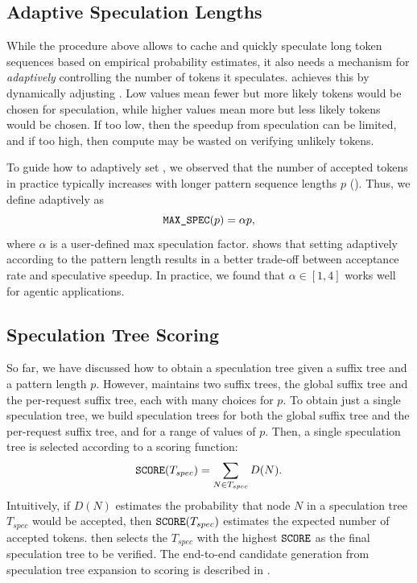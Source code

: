 \subsection{Adaptive Speculation Lengths}
\label{suffixdecoding:sec:adaptive}

While the procedure above allows \SuffixDecoding to cache and quickly speculate long token sequences based on empirical probability estimates, it also needs a mechanism for \emph{adaptively} controlling the number of tokens it speculates. \SuffixDecoding achieves this by dynamically adjusting \sdMaxSpec. Low values mean fewer but more likely tokens would be chosen for speculation, while higher values mean more but less likely tokens would be chosen. If too low, then the speedup from speculation can be limited, and if too high, then compute may be wasted on verifying unlikely tokens.

To guide how to adaptively set \sdMaxSpec, we observed that the number of accepted tokens in practice typically increases with longer pattern sequence lengths \( p \) (). Thus, we define \sdMaxSpec adaptively as
\[
\texttt{MAX\_SPEC}(p) = \alpha p,
\]
where \( \alpha \) is a user-defined max speculation factor.  shows that setting \sdMaxSpec adaptively according to the pattern length results in a better trade-off between acceptance rate and speculative speedup. In practice, we found that \( \alpha \in [1, 4] \) works well for agentic applications.

\subsection{Speculation Tree Scoring}
\label{suffixdecoding:sec:scoring}

So far, we have discussed how to obtain a speculation tree given a suffix tree and a pattern length \( p \). However, \SuffixDecoding maintains two suffix trees, the global suffix tree and the per-request suffix tree, each with many choices for \( p \). To obtain just a single speculation tree, we build speculation trees for both the global suffix tree and the per-request suffix tree, and for a range of values of \( p \). Then, a single speculation tree is selected according to a scoring function:
\[
\texttt{SCORE}(T_{spec}) = \sum_{N \in T_{spec}} D(N).
\]
Intuitively, if \( D(N) \) estimates the probability that node \( N \) in a speculation tree \( T_{spec} \) would be accepted, then \( \texttt{SCORE}(T_{spec}) \) estimates the expected number of accepted tokens. \SuffixDecoding then selects the \( T_{spec} \) with the highest \( \texttt{SCORE} \) as the final speculation tree to be verified.
The end-to-end candidate generation from speculation tree expansion to scoring is described in .


